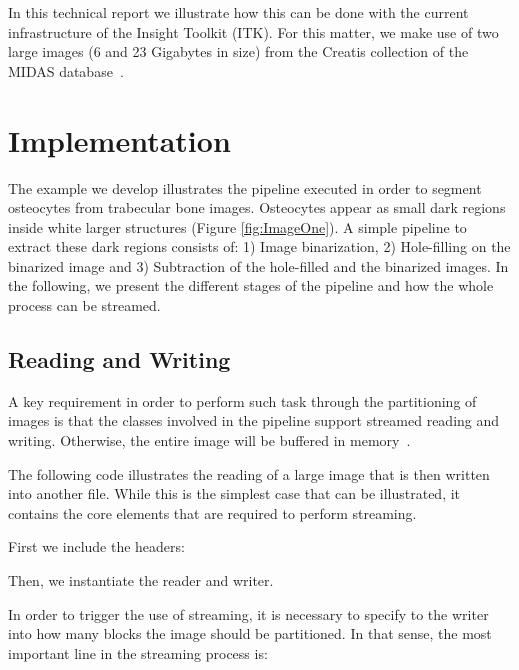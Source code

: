 \documentclass{InsightArticle}
\begin{document}
In this technical report we illustrate how this can be done with the current
infrastructure of the Insight Toolkit (ITK). For this matter,
we make use of two large images (6 and 23 Gigabytes in size) from the
Creatis collection of the MIDAS database~\cite{Zuluaga2011a}.

\section{Implementation}
The example we develop illustrates the pipeline executed in order to segment
osteocytes from trabecular bone images. Osteocytes appear as small dark regions
inside white larger structures (Figure \ref{fig:ImageOne}). A simple pipeline
to extract these dark regions consists of: 1) Image binarization, 2)
Hole-filling on the binarized image and 3) Subtraction of the hole-filled and
the binarized images.  In the following, we present the different stages of the
pipeline and how the whole process can be streamed.

\subsection{Reading and Writing}
A key requirement in order to perform such task through the partitioning of
images is that the  classes involved in the pipeline support
streamed reading and writing. Otherwise, the entire image will be buffered
in memory~\cite{Lowekamp2010}.

The following code illustrates the reading of a large image that is then written
into another file. While this is the simplest case that can be illustrated, it
contains the core elements that are required to perform streaming.

First we include the headers:

\begin{center}

\end{center}

Then, we instantiate the reader and writer.

\begin{center}

\end{center}

In order to trigger the use of streaming, it is necessary to specify to the
writer into how many blocks the image should be partitioned. In that sense, the
most important line in the streaming process is:
\end{document}
